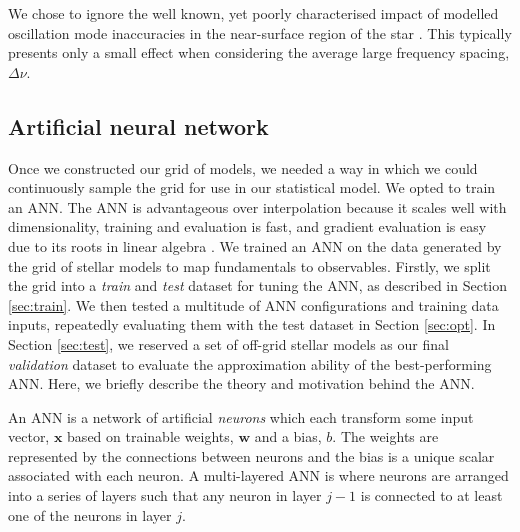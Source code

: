 \documentclass[a4paper,fleqn,usenatbib]{mnras}
\newcommand{\dnu}{\ensuremath{\Delta\nu}}
\begin{document}
We chose to ignore the well known, yet poorly characterised impact of modelled oscillation mode inaccuracies in the near-surface region of the star \citep{Kjeldsen.Bedding.ea2008, Ball.Gizon2014, Sonoi.Samadi.ea2015}. This typically presents only a small effect when considering the average large frequency spacing, $\dnu$. %

\subsection{Artificial neural network}\label{sec:ann}

Once we constructed our grid of models, we needed a way in which we could continuously sample the grid for use in our statistical model. We opted to train an ANN. The ANN is advantageous over interpolation because it scales well with dimensionality, training and evaluation is fast, and gradient evaluation is easy due to its roots in linear algebra \citep{Haykin2007}. We trained an ANN on the data generated by the grid of stellar models to map fundamentals to observables. Firstly, we split the grid into a \emph{train} and \emph{test} dataset for tuning the ANN, as described in Section \ref{sec:train}. We then tested a multitude of ANN configurations and training data inputs, repeatedly evaluating them with the test dataset in Section \ref{sec:opt}. In Section \ref{sec:test}, we reserved a set of off-grid stellar models as our final \emph{validation} dataset to evaluate the approximation ability of the best-performing ANN. Here, we briefly describe the theory and motivation behind the ANN.

An ANN is a network of artificial \emph{neurons} which each transform some input vector, $\boldsymbol{x}$ based on trainable weights, $\boldsymbol{w}$ and a bias, $b$. The weights are represented by the connections between neurons and the bias is a unique scalar associated with each neuron. A multi-layered ANN is where neurons are arranged into a series of layers such that any neuron in layer $j-1$ is connected to at least one of the neurons in layer $j$. 
\end{document}

